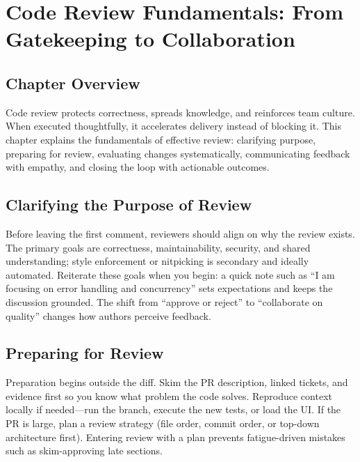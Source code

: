 \chapter{Code Review Fundamentals: From Gatekeeping to Collaboration}

\section{Chapter Overview}
Code review protects correctness, spreads knowledge, and reinforces team culture. When executed thoughtfully, it accelerates delivery instead of blocking it. This chapter explains the fundamentals of effective review: clarifying purpose, preparing for review, evaluating changes systematically, communicating feedback with empathy, and closing the loop with actionable outcomes.

\section{Clarifying the Purpose of Review}
Before leaving the first comment, reviewers should align on why the review exists. The primary goals are correctness, maintainability, security, and shared understanding; style enforcement or nitpicking is secondary and ideally automated. Reiterate these goals when you begin: a quick note such as ``I am focusing on error handling and concurrency'' sets expectations and keeps the discussion grounded. The shift from ``approve or reject'' to ``collaborate on quality'' changes how authors perceive feedback.

\section{Preparing for Review}
Preparation begins outside the diff. Skim the PR description, linked tickets, and evidence first so you know what problem the code solves. Reproduce context locally if needed---run the branch, execute the new tests, or load the UI. If the PR is large, plan a review strategy (file order, commit order, or top-down architecture first). Entering review with a plan prevents fatigue-driven mistakes such as skim-approving late sections.

